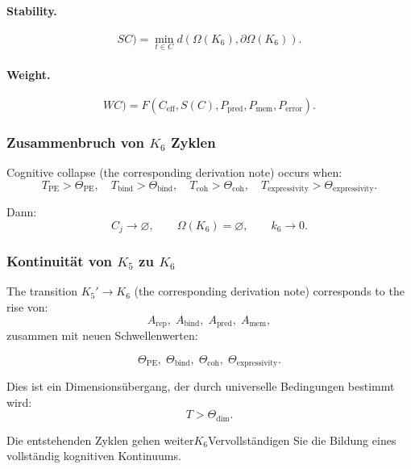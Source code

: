 \paragraph{Stability.}
\[
SC)
  = \min_{t\in C}
    d(\Omega(K_6),\partial\Omega(K_6)).
\]

\paragraph{Weight.}
\[
WC)
 = F(C_{\mathrm{eff}}, S(C), P_{\mathrm{pred}},
      P_{\mathrm{mem}}, P_{\mathrm{error}}).
\]

\subsubsection{Zusammenbruch von \texorpdfstring{$K_6$}{K_6} Zyklen}

Cognitive collapse (the corresponding derivation note) occurs when:
\[
  T_{\mathrm{PE}}>\Theta_{\mathrm{PE}},
  \quad
  T_{\mathrm{bind}}>\Theta_{\mathrm{bind}},
  \quad
  T_{\mathrm{coh}}>\Theta_{\mathrm{coh}},
  \quad
  T_{\mathrm{expressivity}}>\Theta_{\mathrm{expressivity}}.
\]

Dann:
\[
 C_j \to \varnothing,
 \qquad
 \Omega(K_6)=\varnothing,
 \qquad
 k_6\to 0.
\]

\subsubsection{Kontinuität von \texorpdfstring{$K_5$}{K_5} zu \texorpdfstring{$K_6$}{K_6}}

The transition $K_5' \to K_6$ (the corresponding derivation note) corresponds to the rise
von:
\[
 A_{\mathrm{rep}},\;
 A_{\mathrm{bind}},\;
 A_{\mathrm{pred}},\;
 A_{\mathrm{mem}},
\]
zusammen mit neuen Schwellenwerten:

\[
 \Theta_{\mathrm{PE}},\;
 \Theta_{\mathrm{bind}},\;
 \Theta_{\mathrm{coh}},\;
 \Theta_{\mathrm{expressivity}}.
\]

Dies ist ein Dimensionsübergang, der durch universelle Bedingungen bestimmt wird:
\[
  T > \Theta_{\mathrm{dim}}.
\]

Die entstehenden Zyklen gehen weiter$K_6$Vervollständigen Sie die Bildung eines vollständig kognitiven Kontinuums.
